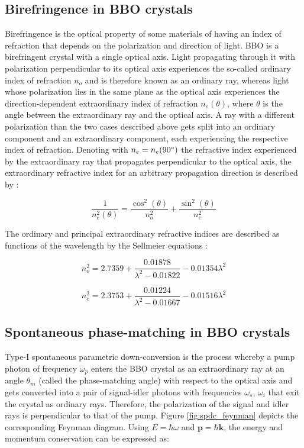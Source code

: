\documentclass[a4paper,
DIV=13,
12pt,
BCOR=10mm,
department=FakEI,
twoside,
parskip=half,
automark,
logostyle=flat,
]{OTHRartcl}
\begin{document}
\subsection{Birefringence in BBO crystals}

Birefringence is the optical property of some materials of having an index of refraction that depends on the polarization and direction of light. BBO is a birefringent crystal with a single optical axis. Light propagating through it with polarization perpendicular to its optical axis experiences the so-called ordinary index of refraction $n_o$ and is therefore known as an ordinary ray, whereas light whose polarization lies in the same plane as the optical axis experiences the direction-dependent extraordinary index of refraction $n_e(\theta)$, where $\theta$ is the angle between the extraordinary ray and the optical axis. A ray with a different polarization than the two cases described above gets split into an ordinary component and an extraordinary component, each experiencing the respective index of refraction. Denoting with $n_e = n_e(90 \degree)$ the refractive index experienced by the extraordinary ray that propagates perpendicular to the optical axis, the extraordinary refractive index for an arbitrary propagation direction is described by \cite{birefringence}:

\begin{equation}
    \frac{1}{n_e^2(\theta)} = \frac{\cos^2 (\theta)}{n_o^2} + \frac{\sin^2 (\theta)}{n_e^2}
    \label{n_e_theta}
\end{equation}


The ordinary and principal extraordinary refractive indices are described as functions of the wavelength by the Sellmeier equations \cite{sellmeier}:

\begin{equation}
    n_o^2 = 2.7359 + \frac{0.01878}{\lambda^2 - 0.01822} - 0.01354 \lambda^2
    \label{sellmeier_n_o}
\end{equation}

\begin{equation}
    n_e^2 = 2.3753 + \frac{0.01224}{\lambda^2 - 0.01667} - 0.01516 \lambda^2
    \label{sellmeier_n_e}
\end{equation}


\subsection{Spontaneous phase-matching in BBO crystals}

Type-I spontaneous parametric down-conversion is the process whereby a pump photon of frequency $\omega_p$ enters the BBO crystal as an extraordinary ray at an angle $\theta_m$ (called the phase-matching angle) with respect to the optical axis and gets converted into a pair of signal-idler photons with frequencies $\omega_s$, $\omega_i$ that exit the crystal as ordinary rays. Therefore, the polarization of the signal and idler rays is perpendicular to that of the pump. Figure \ref{fig:spdc_feynman} depicts the corresponding Feynman diagram. Using $E=\hbar \omega$ and $\mathbf{p} = \hbar \mathbf{k}$, the energy and momentum conservation can be expressed as:
\end{document}

